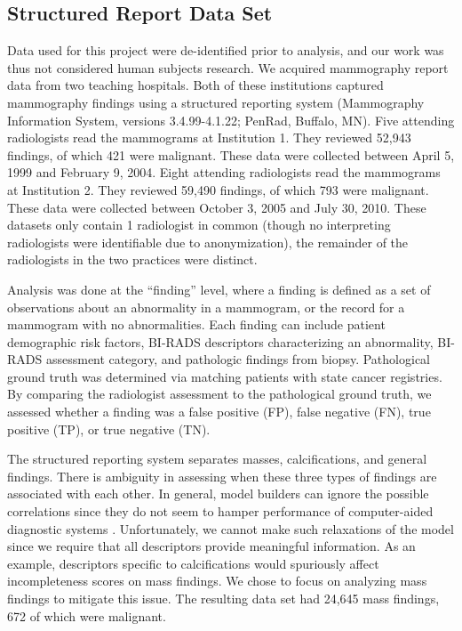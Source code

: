 \subsection{Structured Report Data Set}
Data used for this project were de-identified prior to analysis, and our work was thus not considered human subjects research. We acquired mammography report data from two teaching hospitals. Both of these institutions captured mammography findings using a structured reporting system (Mammography Information System, versions 3.4.99-4.1.22; PenRad, Buffalo, MN). Five attending radiologists read the mammograms at Institution 1. They reviewed 52,943 findings, of which 421 were malignant. These data were collected between April 5, 1999 and February 9, 2004. Eight attending radiologists read the mammograms at Institution 2. They reviewed 59,490 findings, of which 793 were malignant. These data were collected between October 3, 2005 and July 30, 2010. These datasets only contain 1 radiologist in common (though no interpreting radiologists were identifiable due to anonymization), the remainder of the radiologists in the two practices were distinct.

Analysis was done at the ``finding'' level, where a finding is defined as a set of observations about an abnormality in a mammogram, or the record for a mammogram with no abnormalities. Each finding can include patient demographic risk factors, BI-RADS descriptors characterizing an abnormality, BI-RADS assessment category, and pathologic findings from biopsy. Pathological ground truth was determined via matching patients with state cancer registries. By comparing the radiologist assessment to the pathological ground truth, we assessed whether a finding was a false positive (FP), false negative (FN), true positive (TP), or true negative (TN).

The structured reporting system separates masses, calcifications, and general findings. There is ambiguity in assessing when these three types of findings are associated with each other. In general, model builders can ignore the possible correlations since they do not seem to hamper performance of computer-aided diagnostic systems \cite{Burnside:2000wl, ElizabethS:2005gc, Burnside:2009br}. Unfortunately, we cannot make such relaxations of the model since we require that all descriptors provide meaningful information. As an example, descriptors specific to calcifications would spuriously affect incompleteness scores on mass findings. We chose to focus on analyzing mass findings to mitigate this issue. The resulting data set had 24,645 mass findings, 672 of which were malignant.

